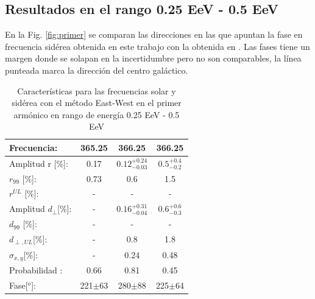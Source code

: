 \subsection{Resultados en el rango 0.25 EeV - 0.5 EeV}

En la Fig. \ref{fig:primer} se comparan las direcciones en las que apuntan la fase en frecuencia sidérea obtenida en este trabajo con la obtenida en \cite{Aab_2020}. 
Las fases tiene un margen donde se solapan en la incertidumbre pero no son comparables, la línea punteada marca la dirección del centro galáctico.
\begin{table}[H]
    \begin{small}
        \begin{center}
            \begin{tabular}[c]{l|c||c|c}
                Frecuencia:                 & 365.25	  & 366.25	                    & 366.25 \cite{Aab_2020}   \\ 
                \hline
                Amplitud r [\%]:            & 0.17	      & $0.12^{+0.24}_{-0.03}$ 	    & $0.5^{+0.4}_{-0.2}$ \cite{codigo}      \\
                $r_{99}$ [\%]:              & 0.73	      & 0.6                         & 1.5\cite{codigo}                 \\
                $r^{UL}$ [\%]:              & - 	      & -                           & -\cite{codigo}                 \\
                \hline
                Amplitud $d_\perp$[\%]:     & -	          & $0.16^{+0.31}_{-0.04}$ 	    & $0.6^{+0.6}_{-0.3}$       \\
                $d_{99}$ [\%]:              & - 	      & -                           & -                 \\
                $d_{\perp,UL}$[\%]:         & -           & 0.8       & 1.8      \\
                \hline
                $\sigma_{x,y}$[\%]:         & -	          & 0.24	   & 0.48       \\
                Probabilidad      :         & 0.66        & 0.81	   & 0.45       \\
                Fase[$^o$]:                 & 221$\pm$63  & 280$\pm$88 & 225$\pm$64\cite{discrepancia} \\
            \end{tabular}
        \end{center}
    \end{small}
    \caption{Características para las frecuencias solar y sidérea con el método East-West en el primer armónico en rango de energía 0.25 EeV - 0.5 EeV}
    \label{tab:solar}
\end{table}


